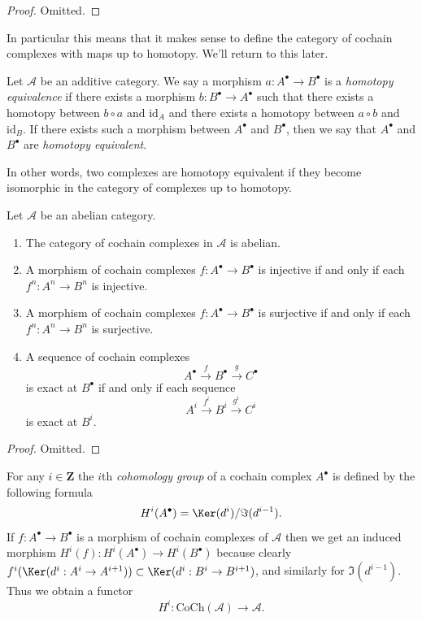 \begin{proof}
Omitted.
\end{proof}

\noindent
In particular this means that it makes sense to define
the category of cochain complexes with maps up to homotopy.
We'll return to this later.

\begin{definition}
\label{definition-homotopy-equivalent-cochain}
Let $\mathcal{A}$ be an additive category.
We say a morphism $a : A^\bullet \to B^\bullet$
is a {\it homotopy equivalence} if there exists
a morphism $b : B^\bullet \to A^\bullet$
such that there exists a homotopy between
$b \circ a$ and $\text{id}_A$
and there exists a homotopy between $a \circ b$ and $\text{id}_B$.
If there exists such a morphism between $A^\bullet$ and $B^\bullet$, then
we say that $A^\bullet$ and $B^\bullet$ are {\it homotopy equivalent}.
\end{definition}

\noindent
In other words, two complexes are homotopy equivalent if they become
isomorphic in the category of complexes up to homotopy.

\begin{lemma}
\label{lemma-cat-cochain-abelian}
Let $\mathcal{A}$ be an abelian category.
\begin{enumerate}
\item The category of cochain complexes in $\mathcal{A}$ is
abelian.
\item A morphism of cochain complexes
$f : A^\bullet \to B^\bullet$ is injective
if and only if each $f^n : A^n \to B^n$ is injective.
\item A morphism of cochain complexes
$f : A^\bullet \to B^\bullet$ is surjective
if and only if each $f^n : A^n \to B^n$ is surjective.
\item A sequence of cochain complexes
$$
A^\bullet \xrightarrow{f} B^\bullet \xrightarrow{g} C^\bullet
$$
is exact at $B^\bullet$ if and only if each sequence
$$
A^i \xrightarrow{f^i} B^i \xrightarrow{g^i} C^i
$$
is exact at $B^i$.
\end{enumerate}
\end{lemma}

\begin{proof}
Omitted.
\end{proof}

\noindent
For any $i \in \mathbf{Z}$ the $i$th {\it cohomology group}
of a cochain complex $A^\bullet$ is defined by
the following formula
$$
H^i(A^\bullet) = \Ker(d^i)/\Im(d^{i - 1}).
$$
If $f : A^\bullet \to B^\bullet$ is a morphism of cochain
complexes of $\mathcal{A}$ then we get an induced
morphism $H^i(f) : H^i(A^\bullet) \to H^i(B^\bullet)$
because clearly
$f^i(\Ker(d^i : A^i \to A^{i + 1})) \subset
\Ker(d^i : B^i \to B^{i + 1})$, and similarly
for $\Im(d^{i - 1})$.
Thus we obtain a functor
$$
H^i : \text{CoCh}(\mathcal{A}) \longrightarrow \mathcal{A}.
$$

